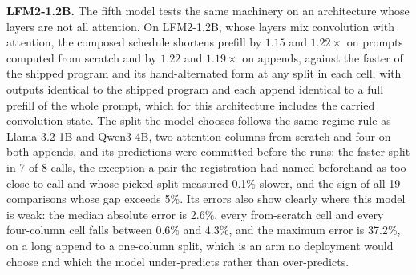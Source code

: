 \textbf{LFM2-1.2B.}
The fifth model tests the same machinery on an architecture whose layers are not all attention.
On LFM2-1.2B, whose layers mix convolution with attention, the composed schedule shortens prefill by $1.15$ and $1.22\times$ on prompts computed from scratch and by $1.22$ and $1.19\times$ on appends, against the faster of the shipped program and its hand-alternated form at any split in each cell, with outputs identical to the shipped program and each append identical to a full prefill of the whole prompt, which for this architecture includes the carried convolution state.
The split the model chooses follows the same regime rule as Llama-3.2-1B and Qwen3-4B, two attention columns from scratch and four on both appends, and its predictions were committed before the runs: the faster split in 7 of 8 calls, the exception a pair the registration had named beforehand as too close to call and whose picked split measured 0.1\% slower, and the sign of all 19 comparisons whose gap exceeds 5\%.
Its errors also show clearly where this model is weak: the median absolute error is 2.6\%, every from-scratch cell and every four-column cell falls between 0.6\% and 4.3\%, and the maximum error is 37.2\%, on a long append to a one-column split, which is an arm no deployment would choose and which the model under-predicts rather than over-predicts.

